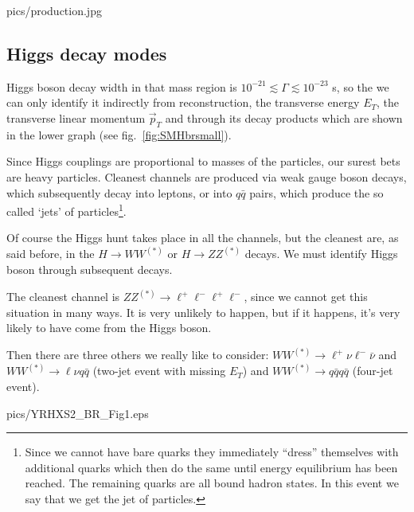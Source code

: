 \vspace{20pt}
\begin{myfig}[12cm]{pics/production.jpg}
	\vspace{12pt}
	\caption{The most common production modes on the Feynman diagrams for better visualization.}
	\label{diagrams}
\end{myfig}

\subsection{Higgs decay modes}

Higgs boson decay width in that mass region is $10^{-21} \lesssim \Gamma \lesssim 10^{-23}$ s, so the we
can only identify it indirectly from reconstruction, the transverse energy $E_T$, the transverse linear momentum $\vec{p}_T$ and through its
decay products which are shown in the lower graph (see fig.~\ref{fig:SMHbrsmall}).

Since Higgs couplings are proportional to masses of the particles, our surest bets are heavy particles. Cleanest channels are produced
via weak gauge boson decays, which subsequently decay into leptons, or into $q\bar{q}$ pairs, which produce the so called `jets' of
particles\footnote{Since we cannot have bare quarks they immediately ``dress'' themselves with additional quarks which then do the same until
energy equilibrium has been reached. The remaining quarks are all bound hadron states. In this event we say that we get the jet of particles.}.

Of course the Higgs hunt takes place in all the channels, but the cleanest are, as said before, in the $H \to WW^{(*)}$ or $H \to ZZ^{(*)}$ decays.
We must identify Higgs boson through subsequent decays.

The cleanest channel is $ZZ^{(*)} \to \ell^+\ell^-\ell^+\ell^-$, since we cannot get this situation in many ways. It is very unlikely to happen,
but if it happens, it's very likely to have come from the Higgs boson.

Then there are three others we really like to consider: $WW^{(*)} \to \ell^+\nu\ell^-\bar{\nu}$ and $WW^{(*)} \to \ell\nu q\bar{q}$ (two-jet event with
missing $E_T$) and $WW^{(*)} \to q\bar{q}q\bar{q}$ (four-jet event).

\vspace{12pt}
\begin{myfig}{pics/YRHXS2_BR_Fig1.eps}
	\caption{SM Higgs boson branching ratios (ratio between this channel decay rate to total decay rate) including uncertainties.
		Plotted by LHC Higgs Cross Section Working Group~\cite{CERN}.}
	\label{fig:SMHbrsmall}
\end{myfig}
